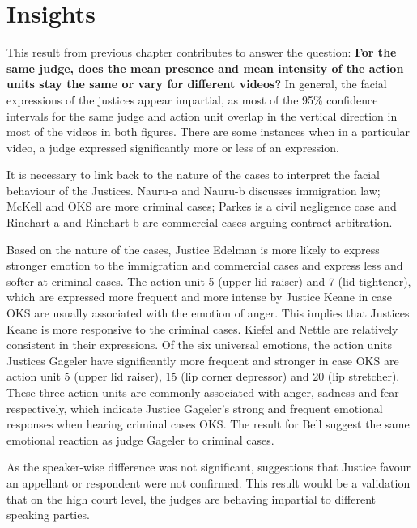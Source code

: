 \documentclass{monashthesis}
\begin{document}
\let\cleardoublepage\clearpage

\hypertarget{insights}{%
\section{Insights}\label{insights}}

This result from previous chapter contributes to answer the question: \textbf{For the same judge, does the mean presence and mean intensity of the action units stay the same or vary for different videos?} In general, the facial expressions of the justices appear impartial, as most of the 95\% confidence intervals for the same judge and action unit overlap in the vertical direction in most of the videos in both figures. There are some instances when in a particular video, a judge expressed significantly more or less of an expression.

It is necessary to link back to the nature of the cases to interpret the facial behaviour of the Justices. Nauru-a and Nauru-b discusses immigration law; McKell and OKS are more criminal cases; Parkes is a civil negligence case and Rinehart-a and Rinehart-b are commercial cases arguing contract arbitration.

Based on the nature of the cases, Justice Edelman is more likely to express stronger emotion to the immigration and commercial cases and express less and softer at criminal cases. The action unit 5 (upper lid raiser) and 7 (lid tightener), which are expressed more frequent and more intense by Justice Keane in case OKS are usually associated with the emotion of anger. This implies that Justices Keane is more responsive to the criminal cases. Kiefel and Nettle are relatively consistent in their expressions. Of the six universal emotions, the action units Justices Gageler have significantly more frequent and stronger in case OKS are action unit 5 (upper lid raiser), 15 (lip corner depressor) and 20 (lip stretcher). These three action units are commonly associated with anger, sadness and fear respectively, which indicate Justice Gageler's strong and frequent emotional responses when hearing criminal cases OKS. The result for Bell suggest the same emotional reaction as judge Gageler to criminal cases.

As the speaker-wise difference was not significant, suggestions that Justice favour an appellant or respondent were not confirmed. This result would be a validation that on the high court level, the judges are behaving impartial to different speaking parties.
\end{document}
